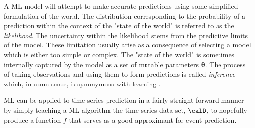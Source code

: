 A ML model will attempt to make accurate predictions using some simplified formulation of the world. The distribution corresponding to the probability of a prediction within the context of the "state of the world" is referred to as the {\it likelihood}. The uncertainty within the likelihood stems from the predictive limits of the model. These limitation usually arise as a consequence of selecting a model which is either too simple or complex. The "state of the world" is sometimes internally captured by the model as a set of mutable parameters $\bm{\theta}$. The process of taking observations and using them to form predictions is called {\it inference} which, in some sense, is synonymous with learning \cite{van2019sparse}.

ML can be applied to time series prediction in a fairly straight forward manner by simply teaching a ML algorithm the time series data set, $\calD$, to hopefully produce a function $f$ that serves as a good approximant for event prediction.

